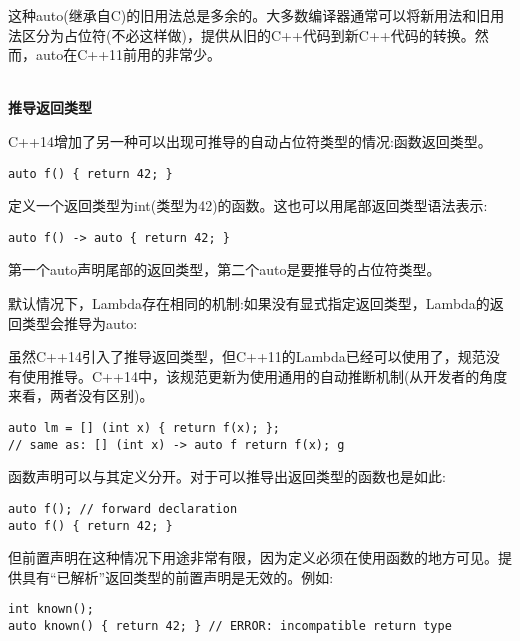 这种auto(继承自C)的旧用法总是多余的。大多数编译器通常可以将新用法和旧用法区分为占位符(不必这样做)，提供从旧的C++代码到新C++代码的转换。然而，auto在C++11前用的非常少。

\hspace*{\fill} \\ %
\noindent
\textbf{推导返回类型}

C++14增加了另一种可以出现可推导的自动占位符类型的情况:函数返回类型。

\begin{lstlisting}[style=styleCXX]
auto f() { return 42; }
\end{lstlisting}

定义一个返回类型为int(类型为42)的函数。这也可以用尾部返回类型语法表示:

\begin{lstlisting}[style=styleCXX]
auto f() -> auto { return 42; }
\end{lstlisting}

第一个auto声明尾部的返回类型，第二个auto是要推导的占位符类型。

默认情况下，Lambda存在相同的机制:如果没有显式指定返回类型，Lambda的返回类型会推导为auto:

\begin{tcolorbox}[colback=webgreen!5!white,colframe=webgreen!75!black]
\hspace*{0.75cm}虽然C++14引入了推导返回类型，但C++11的Lambda已经可以使用了，规范没有使用推导。C++14中，该规范更新为使用通用的自动推断机制(从开发者的角度来看，两者没有区别)。
\end{tcolorbox}

\begin{lstlisting}[style=styleCXX]
auto lm = [] (int x) { return f(x); };
// same as: [] (int x) -> auto f return f(x); g
\end{lstlisting}

函数声明可以与其定义分开。对于可以推导出返回类型的函数也是如此:

\begin{lstlisting}[style=styleCXX]
auto f(); // forward declaration
auto f() { return 42; }
\end{lstlisting}

但前置声明在这种情况下用途非常有限，因为定义必须在使用函数的地方可见。提供具有“已解析”返回类型的前置声明是无效的。例如:

\begin{lstlisting}[style=styleCXX]
int known();
auto known() { return 42; } // ERROR: incompatible return type
\end{lstlisting}

